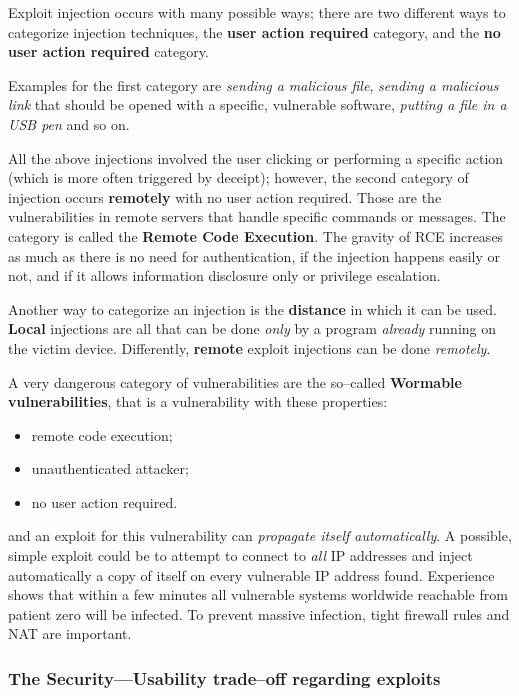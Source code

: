 \documentclass[10pt]{extbook}
\begin{document}
Exploit injection occurs with many possible ways; there are two different ways
to categorize injection techniques, the \textbf{user action required} category,
and the \textbf{no user action required} category.

Examples for the first category are \emph{sending
a malicious file}, \emph{sending a malicious link} that should be opened
with a specific, vulnerable software, \emph{putting a file in a USB pen} and
so on.

All the above injections involved the user clicking or performing a specific
action (which is more often triggered by deceipt); however, the second category
of injection occurs \textbf{remotely} with no user action required. Those are
the vulnerabilities in remote servers that handle specific commands or
messages. The category is called the \textbf{Remote Code Execution}. The
gravity of RCE increases as much as there is no need for authentication, if the
injection happens easily or not, and if it allows information disclosure only
or privilege escalation.

Another way to categorize an injection is the \textbf{distance} in which it can
be used. \textbf{Local} injections are all that can be done \emph{only} by a
program \emph{already} running on the victim device. Differently,
\textbf{remote} exploit injections can be done \emph{remotely}.

A very dangerous category of vulnerabilities are the so--called
\textbf{Wormable vulnerabilities}, that is a vulnerability with these
properties:
\begin{itemize}
    \item remote code execution;
    \item unauthenticated attacker;
    \item no user action required.
\end{itemize}
and an exploit for this vulnerability can \emph{propagate itself
automatically}. A possible, simple exploit could be to attempt to connect to
\emph{all} IP addresses and inject automatically a copy of itself on every
vulnerable IP address found. Experience shows that within a few minutes all
vulnerable systems worldwide reachable from patient zero will be infected. To
prevent massive infection, tight firewall rules and NAT are important.

\subsubsection{The Security---Usability trade--off regarding exploits}
\end{document}
